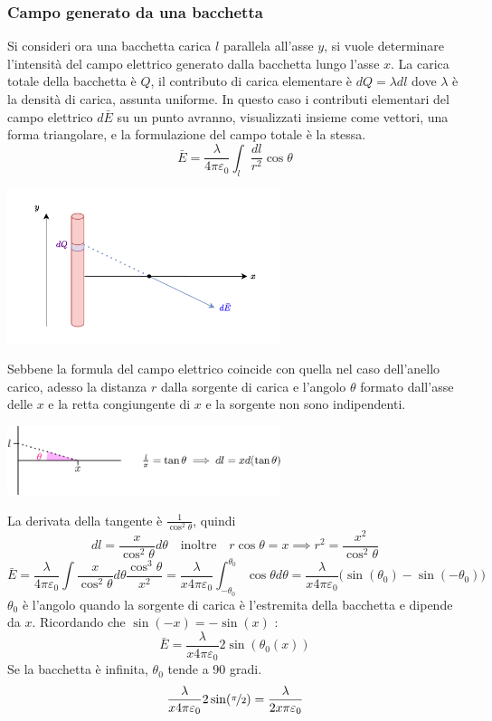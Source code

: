 \documentclass[10pt, letterpaper]{report}
\begin{document}
\subsubsection{Campo generato da una bacchetta}
Si consideri ora una bacchetta carica $l$ parallela all'asse $y$, si vuole determinare l'intensità del campo elettrico generato dalla bacchetta lungo l'asse $x$. La carica totale della bacchetta è $Q$, il contributo di carica elementare è $dQ=\lambda dl$ dove $\lambda$ è la densità di carica, assunta uniforme.\acc 
In questo caso i contributi elementari del campo elettrico $d\bar E$ su un punto avranno, visualizzati insieme come vettori, una forma triangolare, e la formulazione del campo totale è la stessa. 
$$ \bar E = \frac{\lambda}{4\pi\varepsilon_0}\int_l\frac{dl}{r^2}\cos\theta$$
\begin{center}
    \includegraphics[width=0.6\textwidth]{images/bacchettaCarica.pdf}
\end{center}
Sebbene la formula del campo elettrico coincide con quella nel caso dell'anello carico, adesso la distanza $r$ dalla sorgente di carica e l'angolo $\theta$ formato dall'asse delle $x$ e la retta congiungente di  $x$ e la sorgente non sono indipendenti.
\begin{center}
    \includegraphics[width=0.6\textwidth]{images/tan.eps}
\end{center}
La derivata della tangente è $\frac{1}{\cos^2\theta}$, quindi $$ dl=\frac{x}{\cos^2\theta}d\theta
\ \ \ \text{ inoltre } \ \ \
 r\cos\theta=x\implies r^2=\frac{x^2}{\cos^2\theta}$$
$$ \bar E = \frac{\lambda}{4\pi\varepsilon_0}\int \frac{x}{\cos^2\theta}d\theta\frac{\cos^3\theta}{x^2}=\frac{\lambda}{x4\pi\varepsilon_0}\int_{-\theta_0}^{\theta_0}\cos\theta d\theta=\frac{\lambda}{x4\pi\varepsilon_0}\big(\sin(\theta_0)-\sin(-\theta_0)\big)$$
$\theta_0$ è l'angolo quando la sorgente di carica è l'estremita della bacchetta e dipende da $x$. Ricordando che $\sin(-x)=-\sin(x)$ :
$$ \bar E =\frac{\lambda}{x4\pi\varepsilon_0}2\sin(\theta_0(x)) $$
Se la bacchetta è infinita, $\theta_0$ tende a 90 gradi. 
$$ \frac{\lambda}{x4\pi\varepsilon_0}2\sin(\nicefrac{\pi}{2})=\frac{\lambda}{2x\pi\varepsilon_0}$$
\end{document}
